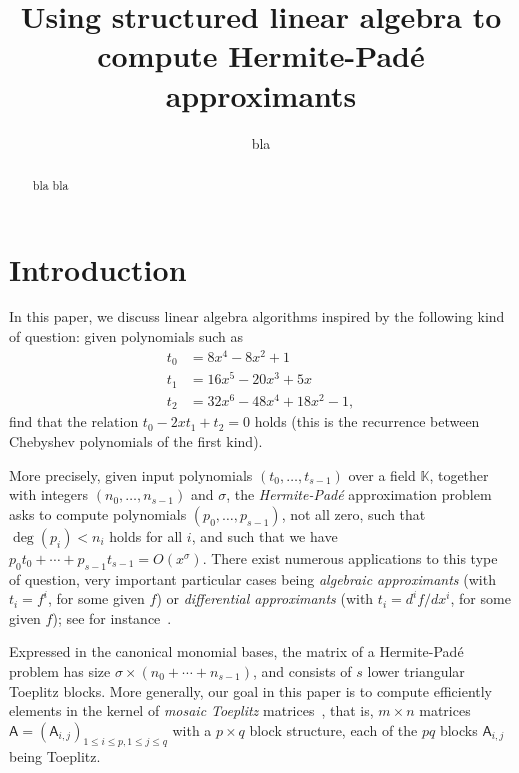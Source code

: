 \documentclass{sig-alternate}
\author{
\alignauthor
bla
\affaddr{blu} \\
\affaddr{bli}
\email{blo@ble}
}
\title{Using structured linear algebra to compute Hermite-Pad\'e
approximants}
\newcommand{\mA}{\ensuremath{\mathsf{A}}}
\newcommand{\K}{\ensuremath{\mathbb{K}}}
\begin{document}
\maketitle

\begin{abstract}
bla bla
\end{abstract}


\section{Introduction}

In this paper, we discuss linear algebra algorithms inspired by the
following kind of question: given polynomials such as
\begin{align*}
t_0 &= 8x^4 - 8x^2 + 1\\
t_1 &= 16x^5 - 20x^3 + 5x\\
t_2 &= 32x^6 - 48x^4 + 18x^2 - 1,
\end{align*}
find that the relation $t_0-2x t_1+t_2=0$ holds (this is the
recurrence between Chebyshev polynomials of the first kind).  

More precisely, given input polynomials $(t_0,\dots,t_{s-1})$ over a
field $\K$, together with integers $(n_0,\dots,n_{s-1})$ and $\sigma$,
the {\em Hermite-Pad\'e} approximation problem asks to compute
polynomials $(p_0,\dots,p_{s-1})$, not all zero, such that $\deg(p_i)
< n_i$ holds for all $i$, and such that we have $p_0 t_0 + \cdots +
p_{s-1} t_{s-1}=O(x^\sigma)$. There exist numerous applications to
this type of question, very important particular cases being {\em
  algebraic approximants} (with $t_i =f^i$, for some given $f$) or
{\em differential approximants} (with $t_i =d^if/dx^i$, for some given
$f$); see for instance~\cite[Chapitre~7]{BoChGiLeLeSaSc17}.

Expressed in the canonical monomial bases, the matrix of a
Hermite-Pad\'e problem has size $\sigma \times (n_0 + \cdots +
n_{s-1})$, and consists of $s$ lower triangular Toeplitz blocks. More
generally, our goal in this paper is to compute efficiently elements
in the kernel of {\em mosaic Toeplitz} matrices~\cite{HeAm88}, that
is, $m \times n$ matrices $\mA=(\mA_{i,j})_{1 \le i \le p,1 \le j \le
  q}$ with a $p \times q$ block structure, each of the $pq$ blocks $\mA_{i,j}$
being Toeplitz.
\end{document}
